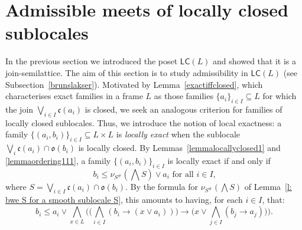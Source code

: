 \documentclass[11pt,a4paper,reqno]{amsart}
\newcommand{\tbigwedge}{\mathop{\textstyle \bigwedge }}%
\newcommand{\tbigvee}{\mathop{\textstyle \bigvee }}%
\def\cl{\mathfrak{c}}
\def\op{\mathfrak{o}}
\newtheorem{lemma}[theorem]{Lemma}
\theoremstyle{definition}
\theoremstyle{remark}
\newcommand{\mf}{\mathsf}
\newcommand{\mi}{\mathit}
\newcommand{\we}{\wedge}
\newcommand{\ve}{\vee}
\begin{document}
{%

\section{Admissible meets of locally closed sublocales}\label{sec.4}

In the previous section we introduced the poset $\mathsf{LC}(L)$ and showed that it is a join-semilattice.
The aim of this section is to study admissibility in $\mathsf{LC}(L)$ (see Subsection~\ref{brunslakser}). 
Motivated by Lemma~\ref{exactiffclosed}, which characterises exact families  in a frame $L$ as those families $\{a_i\}_{i\in I}\subseteq L$ for which the join $\tbigvee_{i\in I} \cl(a_i)$ is closed, we seek an analogous criterion for families of locally closed sublocales. 
Thus, we introduce the notion of {local exactness}: a family $\{(a_i,b_i)\}_{i\in I}\subseteq L\times L$  is \emph{locally exact} when the sublocale $\tbigvee_i \cl(a_i)\cap \op(b_i)$ is locally closed. By Lemmas~\ref{lemmalocallyclosed1} and \ref{lemmaordering111}, a family $\{(a_i,b_i)\}_{i\in I}$ is locally exact if and only if 
\[
b_i\leq \nu_{S^\#}(\tbigwedge S)\ve a_i\text{ for all $i\in I$,}
\]
where $S=\tbigvee_{i\in I} \cl(a_i)\cap \op(b_i)$. By the formula for $\nu_{S^\#}(\tbigwedge S)$ of Lemma~\ref{l: bwe S for a smooth sublocale S},  this amounts to having, for each $i\in I$, that:
$$b_i \leq a_i \vee  \tbigwedge_{x\in L} \biggl(  \big(\tbigwedge _{i\in I} (b_i\to (x\vee a_i)) \big) \to \big( x\vee  \tbigwedge_{j\in I}(b_j\to a_j)\bigr) \biggr).$$


}
\end{document}
